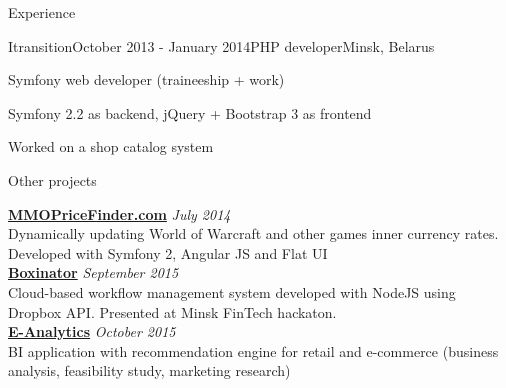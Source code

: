 \documentclass{resume} %
\begin{document}
\begin{rSection}{Experience}

\begin{rSubsection}{Itransition}{October 2013 - January 2014}{PHP developer}{Minsk, Belarus}
\item Symfony web developer (traineeship + work)
\item Symfony 2.2 as backend, jQuery + Bootstrap 3 as frontend
\item Worked on a shop catalog system
\end{rSubsection}

\end{rSection}


\begin{rSection}{Other projects}

{\bf \href{http://mmopricefinder.com}{MMOPriceFinder.com}} \hfill {\em July 2014} \\ 
Dynamically updating World of Warcraft and other games inner currency rates. Developed with Symfony 2, Angular JS and Flat UI \\

{\bf \href{http://boxinator.xyz}{Boxinator}} \hfill {\em September 2015} \\ 
Cloud-based workflow management system developed with NodeJS using Dropbox API. Presented at Minsk FinTech hackaton. \\

{\bf \href{http://pirateminds.com/e-analytics}{E-Analytics}} \hfill {\em October 2015} \\ 
BI application with recommendation engine for retail and e-commerce (business analysis, feasibility study, marketing research) \\

\end{rSection}



\end{document}
